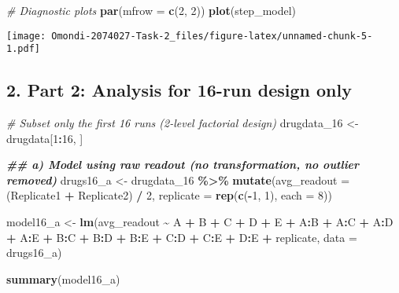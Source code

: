 \documentclass[
]{article}
\newenvironment{Shaded}{\begin{snugshade}}{\end{snugshade}}
\newcommand{\AttributeTok}[1]{\textcolor[rgb]{0.13,0.29,0.53}{#1}}
\newcommand{\CommentTok}[1]{\textcolor[rgb]{0.56,0.35,0.01}{\textit{#1}}}
\newcommand{\DecValTok}[1]{\textcolor[rgb]{0.00,0.00,0.81}{#1}}
\newcommand{\DocumentationTok}[1]{\textcolor[rgb]{0.56,0.35,0.01}{\textbf{\textit{#1}}}}
\newcommand{\FunctionTok}[1]{\textcolor[rgb]{0.13,0.29,0.53}{\textbf{#1}}}
\newcommand{\NormalTok}[1]{#1}
\newcommand{\OtherTok}[1]{\textcolor[rgb]{0.56,0.35,0.01}{#1}}
\newcommand{\SpecialCharTok}[1]{\textcolor[rgb]{0.81,0.36,0.00}{\textbf{#1}}}
\begin{document}
\begin{Shaded}
\begin{Highlighting}[]
\CommentTok{\# Diagnostic plots}
\FunctionTok{par}\NormalTok{(}\AttributeTok{mfrow =} \FunctionTok{c}\NormalTok{(}\DecValTok{2}\NormalTok{, }\DecValTok{2}\NormalTok{))}
\FunctionTok{plot}\NormalTok{(step\_model)}
\end{Highlighting}
\end{Shaded}

\texttt{[image: Omondi-2074027-Task-2\_files/figure-latex/unnamed-chunk-5-1.pdf]}

\hypertarget{part-2-analysis-for-16-run-design-only}{%
\subsection{2. Part 2: Analysis for 16-run design
only}\label{part-2-analysis-for-16-run-design-only}}

\begin{Shaded}
\begin{Highlighting}[]
\CommentTok{\# Subset only the first 16 runs (2{-}level factorial design)}
\NormalTok{drugdata\_16 }\OtherTok{\textless{}{-}}\NormalTok{ drugdata[}\DecValTok{1}\SpecialCharTok{:}\DecValTok{16}\NormalTok{, ]}

\DocumentationTok{\#\# a) Model using raw readout (no transformation, no outlier removed)}
\NormalTok{drugs16\_a }\OtherTok{\textless{}{-}}\NormalTok{ drugdata\_16 }\SpecialCharTok{\%\textgreater{}\%}
  \FunctionTok{mutate}\NormalTok{(}\AttributeTok{avg\_readout =}\NormalTok{ (Replicate1 }\SpecialCharTok{+}\NormalTok{ Replicate2) }\SpecialCharTok{/} \DecValTok{2}\NormalTok{,}
         \AttributeTok{replicate =} \FunctionTok{rep}\NormalTok{(}\FunctionTok{c}\NormalTok{(}\SpecialCharTok{{-}}\DecValTok{1}\NormalTok{, }\DecValTok{1}\NormalTok{), }\AttributeTok{each =} \DecValTok{8}\NormalTok{))}

\NormalTok{model16\_a }\OtherTok{\textless{}{-}} \FunctionTok{lm}\NormalTok{(avg\_readout }\SpecialCharTok{\textasciitilde{}}\NormalTok{ A }\SpecialCharTok{+}\NormalTok{ B }\SpecialCharTok{+}\NormalTok{ C }\SpecialCharTok{+}\NormalTok{ D }\SpecialCharTok{+}\NormalTok{ E }\SpecialCharTok{+}
\NormalTok{                  A}\SpecialCharTok{:}\NormalTok{B }\SpecialCharTok{+}\NormalTok{ A}\SpecialCharTok{:}\NormalTok{C }\SpecialCharTok{+}\NormalTok{ A}\SpecialCharTok{:}\NormalTok{D }\SpecialCharTok{+}\NormalTok{ A}\SpecialCharTok{:}\NormalTok{E }\SpecialCharTok{+}
\NormalTok{                  B}\SpecialCharTok{:}\NormalTok{C }\SpecialCharTok{+}\NormalTok{ B}\SpecialCharTok{:}\NormalTok{D }\SpecialCharTok{+}\NormalTok{ B}\SpecialCharTok{:}\NormalTok{E }\SpecialCharTok{+}
\NormalTok{                  C}\SpecialCharTok{:}\NormalTok{D }\SpecialCharTok{+}\NormalTok{ C}\SpecialCharTok{:}\NormalTok{E }\SpecialCharTok{+}\NormalTok{ D}\SpecialCharTok{:}\NormalTok{E }\SpecialCharTok{+}
\NormalTok{                  replicate,}
                \AttributeTok{data =}\NormalTok{ drugs16\_a)}

\FunctionTok{summary}\NormalTok{(model16\_a)}
\end{Highlighting}
\end{Shaded}
\end{document}
